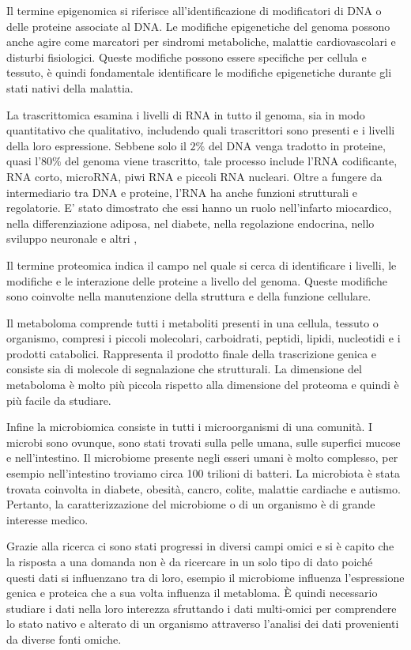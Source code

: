 \documentclass[12pt,italian]{report}
\begin{document}
	Il termine epigenomica si riferisce all'identificazione di modificatori di DNA o delle proteine associate al DNA. Le modifiche epigenetiche del genoma possono anche agire come marcatori per sindromi metaboliche, malattie cardiovascolari e disturbi fisiologici. Queste modifiche possono essere specifiche per cellula e tessuto, è quindi fondamentale identificare le modifiche epigenetiche durante gli stati nativi della malattia.
	
	La trascrittomica esamina i livelli di RNA in tutto il genoma, sia in modo quantitativo che qualitativo, includendo quali trascrittori sono presenti e i livelli della loro espressione. Sebbene solo il $2\%$ del DNA venga tradotto in proteine, quasi l'$80\%$ del genoma viene trascritto, tale processo include l'RNA codificante, RNA corto, microRNA, piwi RNA e piccoli RNA nucleari. Oltre a fungere da intermediario tra DNA e proteine, l'RNA ha anche funzioni strutturali e regolatorie. E' stato dimostrato che essi hanno un ruolo nell'infarto miocardico, nella differenziazione adiposa, nel diabete, nella regolazione endocrina, nello sviluppo neuronale e altri \cite{Hasin2017},
	
	Il termine proteomica indica il campo nel quale si cerca di identificare i livelli, le modifiche e le interazione delle proteine a livello del genoma. Queste modifiche sono coinvolte nella manutenzione della struttura e della funzione cellulare. 
	
	Il metaboloma comprende tutti i metaboliti presenti in una cellula, tessuto o organismo, compresi i piccoli molecolari, carboidrati, peptidi, lipidi, nucleotidi e i prodotti catabolici. Rappresenta il prodotto finale della trascrizione genica e consiste sia di molecole di segnalazione che strutturali. La dimensione del metaboloma è molto più piccola rispetto alla dimensione del proteoma e quindi è più facile da studiare.
	
	Infine la microbiomica consiste in tutti i microorganismi di una comunità. I microbi sono ovunque, sono stati trovati sulla pelle umana, sulle superfici mucose e nell'intestino. Il microbiome presente negli esseri umani è molto complesso, per esempio nell'intestino troviamo circa 100 trilioni di batteri.
	La microbiota è stata trovata coinvolta in diabete, obesità, cancro, colite, malattie cardiache e autismo. Pertanto, la caratterizzazione del microbiome o di un organismo è di grande interesse medico.
	
	Grazie alla ricerca ci sono stati progressi in diversi campi omici e si è capito che la risposta a una domanda non è da ricercare in un solo tipo di dato poiché questi dati si influenzano tra di loro, esempio il microbiome influenza l'espressione genica e proteica che a sua volta influenza il metabloma. È quindi necessario studiare i dati nella loro interezza sfruttando i dati multi-omici per comprendere lo stato nativo e alterato di un organismo attraverso l'analisi dei dati provenienti da diverse fonti omiche.
	
\end{document}
